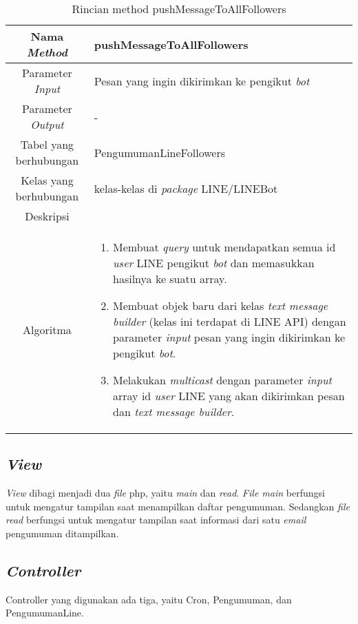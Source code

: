 \begin{center}
	\begin{table}[H]
	\caption{Rincian method pushMessageToAllFollowers}
	\label{table:pengumuman-line-model-pushmessagetoallfollowers}
\begin{tabular}{|c|p{11cm}|}
\hline
Nama \textit{Method} 	& 	 pushMessageToAllFollowers	\\
\hline
Parameter \textit{Input} & Pesan yang ingin dikirimkan ke pengikut \textit{bot} \\
\hline
Parameter \textit{Output} & - \\
\hline
Tabel yang berhubungan & PengumumanLineFollowers \\
\hline
Kelas yang berhubungan & kelas-kelas di \textit{package} LINE/LINEBot \\
\hline
Deskripsi	& \\
\hline
Algoritma	& \begin{enumerate}
				\item Membuat \textit{query} untuk mendapatkan semua id \textit{user} LINE pengikut \textit{bot} dan memasukkan hasilnya ke suatu array.
				\item Membuat objek baru dari kelas \textit{text message builder} (kelas ini terdapat di LINE API) dengan parameter \textit{input} pesan yang ingin dikirimkan ke pengikut \textit{bot}.
				\item Melakukan \textit{multicast} dengan parameter \textit{input} array id \textit{user} LINE yang akan dikirimkan pesan dan \textit{text message builder}.
				\end{enumerate} \\
\hline
\end{tabular}
\end{table}
\end{center}

\subsection{\textit{View}}
\textit{View} dibagi menjadi dua \textit{file} php, yaitu \textit{main} dan \textit{read}. \textit{File main} berfungsi untuk mengatur tampilan saat menampilkan daftar pengumuman. Sedangkan \textit{file read} berfungsi untuk mengatur tampilan saat informasi dari satu \textit{email} pengumuman ditampilkan.

\subsection{\textit{Controller}}
Controller yang digunakan ada tiga, yaitu Cron, Pengumuman, dan PengumumanLine.
